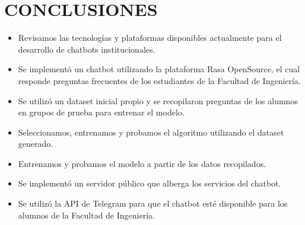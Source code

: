 \chapter[CONCLUSIONES]{CONCLUSIONES}

\begin{itemize}
\item Revisamos las tecnologías y plataformas disponibles actualmente para el desarrollo de chatbots institucionales.
\item Se implementó un chatbot utilizando la plataforma Rasa OpenSource, el cual responde preguntas frecuentes de los estudiantes de la Facultad de Ingeniería.
\item Se utilizó un dataset inicial propio y se recopilaron preguntas de los alumnos en grupos de prueba para entrenar el modelo.
\item Seleccionamos, entrenamos y probamos el algoritmo utilizando el dataset generado.
\item Entrenamos y probamos el modelo a partir de los datos recopilados.
\item Se implementó un servidor público que alberga los servicios del chatbot.
\item Se utilizó la API de Telegram para que el chatbot esté disponible para los alumnos de la Facultad de Ingeniería.
\end{itemize}
